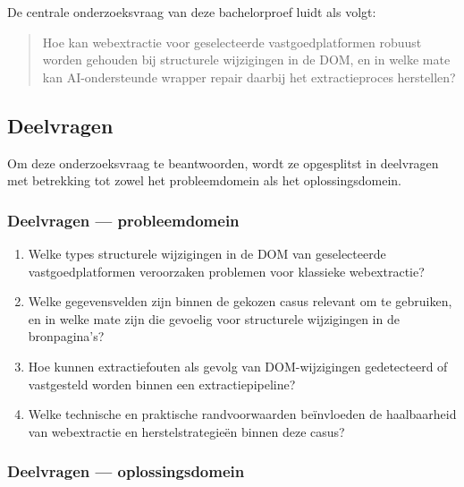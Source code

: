 De centrale onderzoeksvraag van deze bachelorproef luidt als volgt:

\begin{quote}
Hoe kan webextractie voor geselecteerde vastgoedplatformen robuust worden gehouden bij structurele wijzigingen in de DOM, en in welke mate kan AI-ondersteunde wrapper repair daarbij het extractieproces herstellen?
\end{quote}

\subsection{Deelvragen}
\label{subsec:deelvragen}

Om deze onderzoeksvraag te beantwoorden, wordt ze opgesplitst in deelvragen met betrekking tot zowel het probleemdomein als het oplossingsdomein.

\subsubsection{Deelvragen --- probleemdomein}
\label{subsubsec:deelvragen-probleemdomein}

\begin{enumerate}
    \item Welke types structurele wijzigingen in de DOM van geselecteerde vastgoedplatformen veroorzaken problemen voor klassieke webextractie?
    \item Welke gegevensvelden zijn binnen de gekozen casus relevant om te gebruiken, en in welke mate zijn die gevoelig voor structurele wijzigingen in de bronpagina’s?
    \item Hoe kunnen extractiefouten als gevolg van DOM-wijzigingen gedetecteerd of vastgesteld worden binnen een extractiepipeline?
    \item Welke technische en praktische randvoorwaarden beïnvloeden de haalbaarheid van webextractie en herstelstrategieën binnen deze casus?
\end{enumerate}

\subsubsection{Deelvragen --- oplossingsdomein}
\label{subsubsec:deelvragen-oplossingsdomein}

